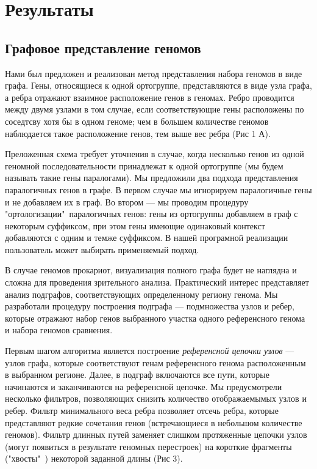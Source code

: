 

\section*{Результаты}

\subsection*{Графовое представление геномов}

Нами был предложен и реализован метод представления набора геномов в виде графа. Гены, относящиеся к одной ортогруппе, представляются в виде узла графа, а ребра отражают взаимное расположение генов в геномах. Ребро проводится между двумя узлами в том случае, если соответствующие гены расположены по соседтсву хотя бы в одном геноме; чем в большем количестве геномов наблюдается такое расположение генов, тем выше вес ребра (Рис 1 А).

Преложенная схема требует уточнения в случае, когда несколько генов из одной геномной последовательности принадлежат к одной ортогруппе (мы будем называть такие гены паралогами). Мы предложили два подхода представления паралогичных генов в графе. В первом случае мы игнорируем паралогичные гены и не добавляем их в граф. Во втором --- мы проводим процедуру "ортологизации"\ паралогичных генов: гены из ортогруппы добавляем в граф с некоторым суффиксом, при этом гены имеющие одинаковый контекст добавляются с одним и темже суффиксом. В нашей програмной реализации пользователь может выбирать применяемый подход. 

В случае геномов прокариот, визуализация полного графа будет не наглядна и сложна для проведения зрительного анализа. Практический интерес представляет анализ подграфов, соответствующих определенному региону генома. Мы разработали процедуру построения подграфа --- подмножества узлов и ребер, которые отражают набор генов выбранного участка одного референсного генома и набора геномов сравнения. 

Первым шагом алгоритма является построение \textit{референсной цепочки узлов} --- узлов графа, которые соответствуют генам референсного генома расположенным в выбранном регионе. Далее, в подграф включаются все пути, которые начинаются и заканчиваются на референсной цепочке. Мы предусмотрели несколько фильтров, позволяющих снизить количество отображаемымых узлов и ребер. Фильтр минимального веса ребра позволяет отсечь ребра, которые представляют редкие сочетания генов (встречающиеся в небольшом количестве геномов). Фильтр длинных путей заменяет слишком протяженные цепочки узлов (могут появиться в результате геномных перестроек) на короткие фрагменты ("хвосты"\ ) некоторой заданной длины (Рис 3). 

